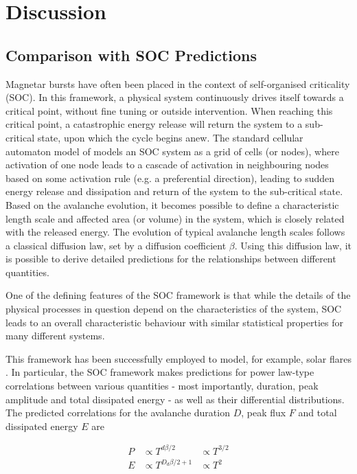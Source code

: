 \documentclass[12pt]{emulateapj}
\begin{document}
\section{Discussion}


\subsection{Comparison with SOC Predictions}
\label{sec:soc}

Magnetar bursts have often been placed in the context of self-organised criticality (SOC). In this framework, a physical system continuously drives
itself towards a critical point, without fine tuning or outside intervention. When reaching this critical point, a catastrophic energy
release will return the system to a sub-critical state, upon which the cycle begins anew. The standard cellular automaton model of \citet{bak1987} models an SOC system as a grid of cells (or nodes), where activation of one node leads to a cascade of activation in neighbouring nodes based on some activation rule (e.g. a preferential direction), leading to 
sudden energy release and dissipation and return of the system to the sub-critical state.
Based on the avalanche evolution, it becomes possible to define a characteristic length scale and affected 
area (or volume) in the system, which is closely related with the released energy. 
The evolution of typical avalanche length scales follows a classical diffusion law, set by a diffusion coefficient $\beta$. 
 Using this diffusion law, it is possible to derive detailed predictions for the relationships between different quantities.

One of the defining features of the SOC framework is that while the details of the physical processes in question depend on the characteristics
of the system, SOC leads to an overall characteristic behaviour with similar statistical properties for many different systems. 


 This framework has been successfully employed to model, for example, solar flares \citep[for an overview see ][ and references therein]{aschwanden2014}.
In particular, the SOC framework makes predictions for power law-type correlations between various quantities - most importantly, duration, 
peak amplitude and total dissipated energy -  as well as their differential distributions. 
The predicted correlations for the avalanche duration $D$, peak flux $F$ and total dissipated energy $E$ are

\begin{eqnarray}
P & \propto  T^{d\beta/2} &\propto  T^{3/2} \\ 
E &\propto   T^{D_d\beta/2 + 1} & \propto  T^{2} \\
\end{eqnarray}
\end{document}
